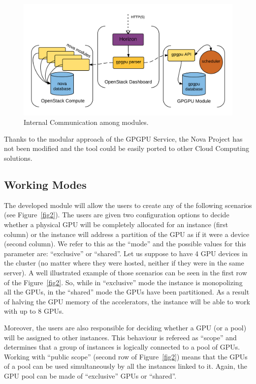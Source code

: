\documentclass[a4paper,twoside]{article}
\begin{document}
\begin{figure}[htb]
  \centering
  \includegraphics[width=\linewidth]{images/os2.png}
  \caption{Internal Communication among modules.}
  \label{fig:internal}
\end{figure}

Thanks to the modular approach of the GPGPU Service, the Nova Project has not been modified and the tool could be easily ported to other Cloud Computing solutions.

\subsection{Working Modes}
The developed module will allow the users to create any of the following scenarios (see Figure~\ref{fig2}). 
The users are given two configuration options to decide whether a physical GPU will be completely allocated for an instance (first column) or the instance will address a partition of the GPU as if it were a device (second column).
We refer to this as the ``mode'' and the possible values for this parameter are: ``exclusive'' or ``shared''. 
Let us suppose to have 4 GPU devices in the cluster (no matter where they were hosted, neither if they were in the same server). 
A well illustrated example of those scenarios can be seen in the first row of the  Figure~\ref{fig2}.
So, while in ``exclusive'' mode the instance is monopolizing all the GPUs, in the ``shared'' mode the GPUs have been partitioned. 
As a result of halving the GPU memory of the accelerators, the instance will be able to work with up to 8 GPUs.

Moreover, the users are also responsible for deciding whether a GPU (or a pool) will be assigned to other instances. 
This behaviour is refereed as ``scope'' and determines that a group of instances is logically connected to a pool of GPUs.
Working with ``public scope'' (second row of Figure~\ref{fig2}) means that the GPUs of a pool can be used simultaneously by all the instances linked to it.
Again, the GPU pool can be made of ``exclusive'' GPUs or ``shared''.
\end{document}

